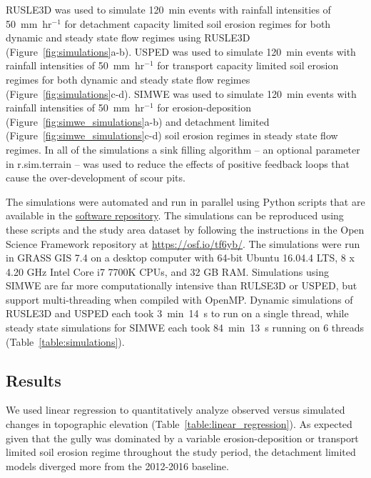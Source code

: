 \documentclass[gmd, manuscript]{copernicus}
\begin{document}
RUSLE3D was used to simulate 120~\unit{min} events
with rainfall intensities of 50~\unit{mm~hr}$^{-1}$
for detachment capacity limited soil erosion regimes
for both dynamic and steady state flow regimes
using RUSLE3D
(Figure~\ref{fig:simulations}a-b).
% 
USPED was used to simulate 120~\unit{min} events
with rainfall intensities of \unit{50~mm~hr}$^{-1}$
for transport capacity limited soil erosion regimes
for both dynamic and steady state flow regimes
(Figure~\ref{fig:simulations}c-d).
%
SIMWE was used to simulate 120~\unit{min} events 
with rainfall intensities of 50~\unit{mm~hr}$^{-1}$
for erosion-deposition (Figure~\ref{fig:simwe_simulations}a-b)
and detachment limited (Figure~\ref{fig:simwe_simulations}c-d)
soil erosion regimes in steady state flow regimes.
%
In all of the simulations 
a sink filling algorithm
-- an optional parameter in r.sim.terrain -- 
was used to reduce the effects of positive feedback loops
that cause the over-development of scour pits. 

The simulations were automated and run in parallel
using Python scripts that are available in the 
\href{https://github.com/baharmon/landscape_evolution}{software repository}.
The simulations can be reproduced using these scripts
and the study area dataset 
by following the instructions 
in the Open Science Framework repository 
at \url{https://osf.io/tf6yb/}.
The simulations were run 
in GRASS GIS 7.4 
on a desktop computer 
with 64-bit Ubuntu 16.04.4 LTS,
8 x 4.20 GHz Intel Core i7 7700K CPUs,
and 32 GB RAM. 
Simulations using SIMWE 
are far more computationally intensive
than RULSE3D or USPED, 
but support multi-threading 
when compiled with OpenMP. 
Dynamic simulations of RUSLE3D and USPED each took
3~\unit{min}~14~\unit{s} to run on a single thread, 
while steady state simulations for SIMWE each took 
84~\unit{min}~13~\unit{s} running on 6 threads
(Table~\ref{table:simulations}).


\subsection{Results}

We used linear regression to quantitatively analyze 
observed versus simulated changes in topographic elevation
(Table~\ref{table:linear_regression}).
As expected given that the gully was dominated 
by a variable erosion-deposition 
or  transport limited soil erosion regime 
throughout the study period,
the detachment limited models diverged more from the 
2012-2016 baseline. 
\end{document}
